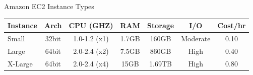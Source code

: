 \begin{frame}{Amazon EC2 Instance Types}
\begin{changemargin}{-0.7cm}{0cm}
	\begin{tabular}{lcccccc}
	  Instance & Arch & CPU (GHZ) & RAM & Storage & I/O & Cost/hr \\\hline
	  Small     & 32bit & 1.0-1.2 (x1) & 1.7GB & 160GB & Moderate & 0.10 \pause\\
	  Large     & 64bit & 2.0-2.4 (x2) & 7.5GB & 860GB & High & 0.40 \pause\\
	  X-Large   & 64bit & 2.0-2.4 (x4) & 15GB & 1.69TB & High & 0.80
	\end{tabular}
\end{changemargin}
\end{frame}
